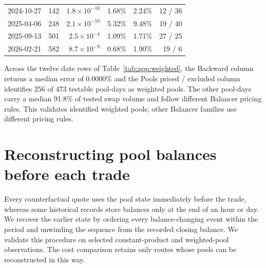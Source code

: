 \begin{table}[t]
\begin{tabular}{lrrrrr}
2024-10-27 & 142 & $1.8\times10^{-10}$ & 1.68\% & 2.24\% & 12 / 36 \\
2025-04-06 & 248 & $2.1\times10^{-10}$ & 5.32\% & 9.48\% & 19 / 40 \\
2025-09-13 & 501 & $2.5\times10^{-4}$ & 1.09\% & 1.71\% & 27 / 25 \\
2026-02-21 & 582 & $8.7\times10^{-9}$ & 0.68\% & 1.90\% & 19 / 6 \\
\bottomrule
\end{tabular}
\end{table}

Across the twelve date rows of Table~\ref{tab:app:weighted}, the Backward column returns a median error of 0.0000\% and the Pools priced / excluded column identifies 256 of 473 testable pool-days as weighted pools. The other pool-days carry a median 91.8\% of tested swap volume and follow different Balancer pricing rules. This validates identified weighted pools; other Balancer families use different pricing rules.

\section{Reconstructing pool balances before each trade}
\label{app:state}

Every counterfactual quote uses the pool state immediately before the trade, whereas some historical records store balances only at the end of an hour or day. We recover the earlier state by ordering every balance-changing event within the period and unwinding the sequence from the recorded closing balance. We validate this procedure on selected constant-product and weighted-pool observations. The cost comparison retains only routes whose pools can be reconstructed in this way.

